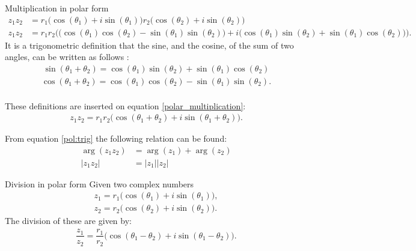 \begin{prof}{Multiplication in polar form}{}
\begin{align}
z_1 z_2&=r_1 \big( \cos(\theta_1)+ i \sin(\theta_1)\big)r_2 \big( \cos(\theta_2)+ i \sin(\theta_2)\big) \nonumber
\\
\label{polar_multiplication}
z_1z_2&=r_1r_2\Big( \big(\cos(\theta_1)\cos(\theta_2)-\sin(\theta_1) \sin(\theta_2)\big)+i\big(\cos(\theta_1)\sin(\theta_2)+\sin(\theta_1)\cos(\theta_2)\big)\Big).
\end{align}
It is a trigonometric definition that the sine, and the cosine, of the sum of two angles, can be written as follows \cite[p. A-14 Appendicies]{calc}:
\\
\begin{align} 
\sin(\theta_1+\theta_2)=\cos(\theta_1)\sin(\theta_2)+\sin(\theta_1)\cos(\theta_2) \label{sum_cos_sin}
\end{align}
\begin{align*}
\cos(\theta_1+\theta_2)=\cos(\theta_1)\cos(\theta_2)-\sin(\theta_1)\sin(\theta_2).
\end{align*}
\\
These definitions are inserted on equation \eqref{polar_multiplication}:
\\
\begin{align*}
z_1 z_2=r_1r_2\big( \cos(\theta_1+\theta_2)+ i \sin(\theta_1+\theta_2)\big).
\end{align*}
\end{prof}

\noindent From equation \ref{pol:trig} the following relation can be found:
\begin{align}
\arg(z_1z_2)&=\arg(z_1)+\arg(z_2)
\\
|z_1z_2|&=|z_1||z_2|
\end{align}

\begin{theorem}{Division in polar form}{}
Given two complex numbers
\begin{align*}
z_1=r_1\big(\cos(\theta_1)+i\sin(\theta_1)\big), 
\\
z_2=r_2\big(\cos(\theta_2)+i\sin(\theta_2)\big).
\end{align*}
The division of these are given by:
\begin{align*}
\dfrac{z_1}{z_2}=\dfrac{r_1}{r_2}\Big( \cos(\theta_1-\theta_2)+ i \sin(\theta_1-\theta_2)\Big).
\end{align*}
\end{theorem}


